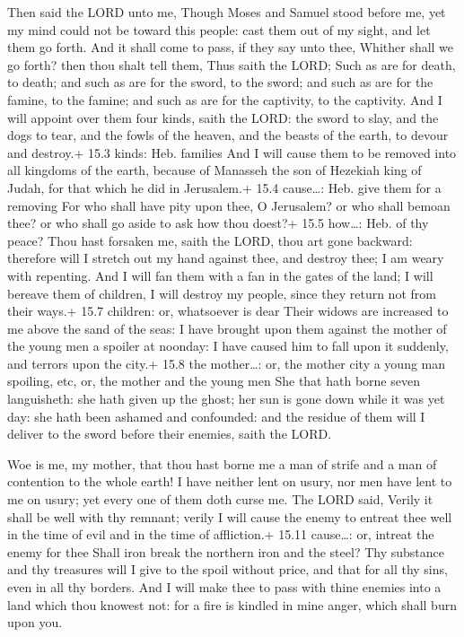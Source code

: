  Then said the LORD unto me, Though Moses and Samuel stood
before me, yet my mind could not be toward this people: cast them out of
my sight, and let them go forth.  And it shall come to pass,
if they say unto thee, Whither shall we go forth? then thou shalt tell
them, Thus saith the LORD; Such as are for death, to death; and such as
are for the sword, to the sword; and such as are for the famine, to the
famine; and such as are for the captivity, to the captivity.
 And I will appoint over them four kinds, saith the LORD:
the sword to slay, and the dogs to tear, and the fowls of the heaven,
and the beasts of the earth, to devour and destroy.+ 15.3 kinds: Heb.
families  And I will cause them to be removed into all
kingdoms of the earth, because of Manasseh the son of Hezekiah king of
Judah, for that which he did in Jerusalem.+ 15.4 cause\ldots: Heb. give
them for a removing  For who shall have pity upon thee, O
Jerusalem? or who shall bemoan thee? or who shall go aside to ask how
thou doest?+ 15.5 how\ldots: Heb. of thy peace?  Thou hast
forsaken me, saith the LORD, thou art gone backward: therefore will I
stretch out my hand against thee, and destroy thee; I am weary with
repenting.  And I will fan them with a fan in the gates of
the land; I will bereave them of children, I will destroy my people,
since they return not from their ways.+ 15.7 children: or, whatsoever is
dear  Their widows are increased to me above the sand of the
seas: I have brought upon them against the mother of the young men a
spoiler at noonday: I have caused him to fall upon it suddenly, and
terrors upon the city.+ 15.8 the mother\ldots: or, the mother city a
young man spoiling, etc, or, the mother and the young men 
She that hath borne seven languisheth: she hath given up the ghost; her
sun is gone down while it was yet day: she hath been ashamed and
confounded: and the residue of them will I deliver to the sword before
their enemies, saith the LORD.

 Woe is me, my mother, that thou hast borne me a man of
strife and a man of contention to the whole earth! I have neither lent
on usury, nor men have lent to me on usury; yet every one of them doth
curse me.  The LORD said, Verily it shall be well with thy
remnant; verily I will cause the enemy to entreat thee well in the time
of evil and in the time of affliction.+ 15.11 cause\ldots: or, intreat
the enemy for thee  Shall iron break the northern iron and
the steel?  Thy substance and thy treasures will I give to
the spoil without price, and that for all thy sins, even in all thy
borders.  And I will make thee to pass with thine enemies
into a land which thou knowest not: for a fire is kindled in mine anger,
which shall burn upon you.

